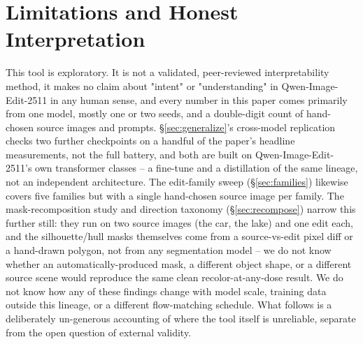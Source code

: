\documentclass[10pt,twocolumn]{article}
\newcommand{\model}{Qwen-Image-Edit-2511}
\begin{document}
\section{Limitations and Honest Interpretation}\label{sec:limits}

This tool is exploratory. It is not a validated, peer-reviewed
interpretability method, it makes no claim about "intent" or
"understanding" in \model{} in any human sense, and every number in this
paper comes primarily from one model, mostly one or two seeds, and a
double-digit count of hand-chosen source images and prompts.
\S\ref{sec:generalize}'s cross-model replication checks two further
checkpoints on a handful of the paper's headline measurements, not the
full battery, and both are built on \model{}'s own transformer classes --
a fine-tune and a distillation of the same lineage, not an independent
architecture. The edit-family sweep (\S\ref{sec:families}) likewise
covers five families but with a single hand-chosen source image per
family. The mask-recomposition study and direction taxonomy
(\S\ref{sec:recompose}) narrow this further still: they run on two
source images (the car, the lake) and one edit each, and the
silhouette/hull masks themselves come from a source-vs-edit pixel diff
or a hand-drawn polygon, not from any segmentation model -- we do not
know whether an automatically-produced mask, a different object shape,
or a different source scene would reproduce the same clean
recolor-at-any-dose result. We do not know how any of these findings
change with model scale, training data outside this lineage, or a
different flow-matching schedule. What follows is a deliberately un-generous accounting of where
the tool itself is unreliable, separate from the open question of
external validity.
\end{document}
